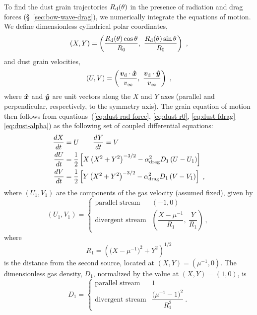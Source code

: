 To find the dust grain trajectories \(R_{\text{d}}(\theta)\) in the presence of
radiation and drag forces (\S~\ref{sec:bow-wave-drag}), we numerically
integrate the equations of motion. We define dimensionless cylindrical
polar coordinates,
\begin{equation}
  \label{eq:dust-XY}
  (X, Y) = \left(\frac{R\grain(\theta) \cos\theta } {R_0}, \ 
    \frac{R\grain(\theta) \sin\theta } {R_0}\right)
  \ ,
\end{equation}
and dust grain velocities,
\begin{equation}
  \label{eq:dust-UV}
  (U, V) = \left( \frac{\bm{v}\grain \cdot \uvec{x}} {v_\infty}, \ 
  \frac{\bm{v}\grain \cdot \uvec{y}} {v_\infty}\right) \ ,
\end{equation}
where \(\bm{\hat{x}}\) and \(\bm{\hat{y}}\) are unit vectors along the \(X\)
and \(Y\) axes (parallel and perpendicular, respectively, to the
symmetry axis).  The grain equation of motion then follows from
equations~(\ref{eq:dust-rad-force}, \ref{eq:dust-r0},
\ref{eq:dust-fdrag}--\ref{eq:dust-alpha}) as the following set of
coupled differential equations:
\begin{gather}
  \label{eq:dust-motion}
  \begin{aligned}
    \frac{d X}{d t} &= U \quad\quad
    \frac{d Y}{d t} = V \\
    \frac{d U}{d t} &= \frac12 \left[  
      X \left(X^2 + Y^2\right)^{-3/2} - \alpha_{\text{drag}}^2 D_1 \left(U - U_1\right)
    \right] \\
    \frac{d V}{d t} &= \frac12 \left[  
      Y \left(X^2 + Y^2\right)^{-3/2} - \alpha_{\text{drag}}^2 D_1 \left(V - V_1\right)
    \right] \ ,
  \end{aligned}
\end{gather}
where \((U_1, V_1)\) are the components of the gas velocity (assumed
fixed), given by
\begin{equation}
  \label{eq:dust-gas-velocities}
  (U_1, V_1) = 
  \begin{cases}
    \text{parallel stream} & (-1, 0)\\
    \text{divergent stream} &
    \left( \dfrac{X - \mu^{-1}}{R_1},\ \dfrac{Y}{R_1}\right) \ ,
  \end{cases}
\end{equation}
where
\begin{equation}
  \label{eq:dust-R1}
  R_1 = \left( \bigl(X - \mu^{-1}\bigr)^2 + Y^2 \right)^{1/2}
\end{equation}
is the distance from the second source, located at
\((X, Y) = (\mu^{-1}, 0)\).  The dimensionless gas density, \(D_1\),
normalized by the value at \((X, Y) = (1, 0)\), is
\begin{equation}
  \label{eq:dust-gas-density}
  D_1 = 
  \begin{cases}
    \text{parallel stream} & 1\\
    \text{divergent stream} & \dfrac{\bigl(\mu^{-1} - 1\bigr)^2} {R_1^{2}} \ .
  \end{cases}
\end{equation}

